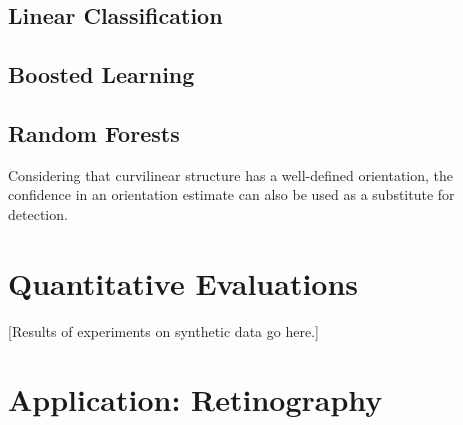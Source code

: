 \documentclass{IEEEtran}
\begin{document}
\subsection{Linear Classification}
\label{s:learning_linear}


%

\subsection{Boosted Learning}
\label{s:learning_boosted}
%

\subsection{Random Forests}
\label{s:learning_forest}



%

Considering that curvilinear structure has a well-defined orientation, the confidence in an orientation estimate can also be used as a substitute for detection.


\clearpage
\section{Quantitative Evaluations}
[Results of experiments on synthetic data go here.]


\clearpage
\section{Application: Retinography}
\label{s:app_retinography}






\end{document}
